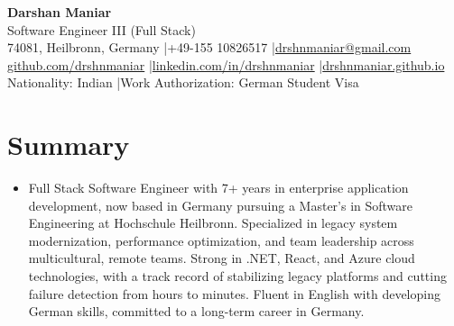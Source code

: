 \documentclass[a4paper,11pt]{article}
\newcommand{\name}{Darshan Maniar} %
\begin{document}

\begin{center}
    {\huge \textbf{\name}} \\[0.4em]
    Software Engineer III (Full Stack) \\[0.35em]
    74081, Heilbronn, Germany \enspace|\enspace +49-155 10826517 \enspace|\enspace \href{mailto:drshnmaniar@gmail.com}{drshnmaniar@gmail.com} \\[0.25em]
    \href{https://github.com/drshnmaniar}{github.com/drshnmaniar} \enspace|\enspace \href{https://www.linkedin.com/in/drshnmaniar}{linkedin.com/in/drshnmaniar} \enspace|\enspace \href{https://drshnmaniar.github.io}{drshnmaniar.github.io} \\[0.25em]
    Nationality: Indian \enspace|\enspace Work Authorization: German Student Visa
\end{center}

\vspace{-2.5mm}
\section{\textbf{Summary}}

 \begin{itemize}[leftmargin=0.05in, label={}]
    \small\item {Full Stack Software Engineer with 7+ years in enterprise application development, now based in Germany pursuing a Master's in Software Engineering at Hochschule Heilbronn. Specialized in legacy system modernization, performance optimization, and team leadership across multicultural, remote teams. Strong in .NET, React, and Azure cloud technologies, with a track record of stabilizing legacy platforms and cutting failure detection from hours to minutes. Fluent in English with developing German skills, committed to a long-term career in Germany.}
 \end{itemize}
 \vspace{-16pt}
\end{document}
